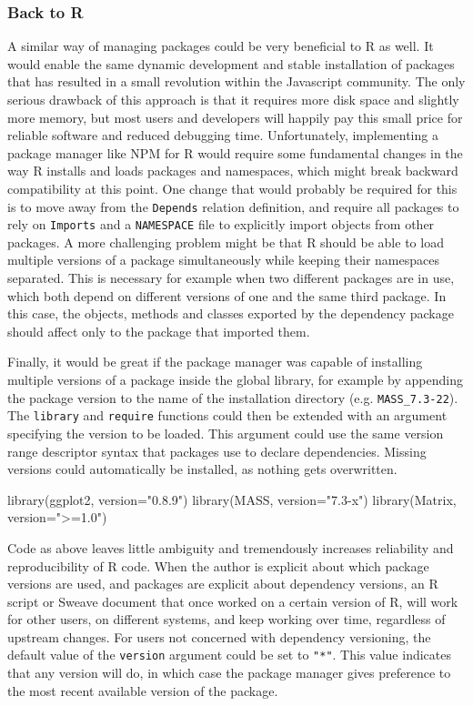\subsubsection{Back to R}

A similar way of managing packages could be very beneficial to R as well. It would
enable the same dynamic development and stable installation of packages that has
resulted in a small revolution within the Javascript community. The only serious
drawback of this approach is that it requires more disk space and slightly
more memory, but most users and developers will happily pay this small price for
reliable software and reduced debugging time. Unfortunately, implementing a package
manager like NPM for R would require some fundamental changes in the way R installs
and loads packages and namespaces, which might break backward compatibility at this
point.
One change that would probably be required for this is to move away from the
\texttt{Depends} relation definition, and require all packages to rely on
\texttt{Imports} and a \texttt{NAMESPACE} file to explicitly import objects
from other packages. A more challenging problem might be that R should be able
to load multiple versions of a package simultaneously while keeping their
namespaces separated. This is necessary for example when two different packages
are in use, which both depend on different versions of one and the same third
package. In this case, the objects, methods and classes exported by the
dependency package should affect only to the package that imported them.

Finally, it would be great if the package manager was capable of installing
multiple versions of a package inside the global library, for example by appending
the package version to the name of the installation directory (e.g. \texttt{MASS\_7.3-22}).
The \texttt{library} and \texttt{require} functions could then be extended with
an argument specifying the version to be loaded. This argument could use the
same version range descriptor syntax that packages use to declare dependencies.
Missing versions could automatically be installed, as nothing gets overwritten.

\begin{example}
  library(ggplot2, version="0.8.9")
  library(MASS, version="7.3-x")
  library(Matrix, version=">=1.0")
\end{example}

Code as above leaves little ambiguity and tremendously increases reliability
and reproducibility of R code. When the author is explicit about which package
versions are used, and packages are explicit about dependency versions, an R
script or Sweave document that once worked on a certain version of R, will work
for other users, on different systems, and keep working over time, regardless
of upstream changes. For users not concerned with dependency versioning, the
default value of the \texttt{version} argument could be set to \texttt{"*"}.
This value indicates that any version will do, in which case the package
manager gives preference to the most recent available version of the package.

